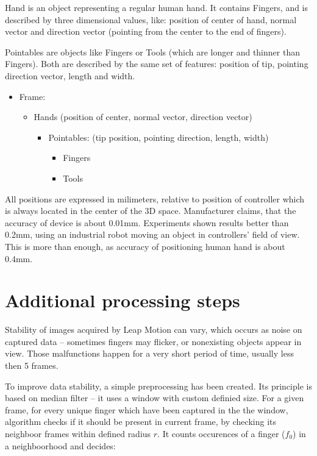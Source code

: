 Hand is an object representing a regular human hand. It contains Fingers, and is described by three dimensional values, like: position of center of hand, normal vector and direction vector (pointing from the center to the end of fingers). 

Pointables are objects like Fingers or Tools (which are longer and thinner than Fingers). Both are described by the same set of features: position of tip, pointing direction vector, length and width.

\begin{itemize}
	\item Frame:
	\begin{itemize}
		\item Hands (position of center, normal vector, direction vector)
			\begin{itemize}
				\item Pointables: (tip position, pointing direction, length, width)
				\begin{itemize}
					\item Fingers
					\item Tools
				\end{itemize}
			\end{itemize}
	\end{itemize}
\end{itemize}

All positions are expressed in milimeters, relative to position of controller which is always located in the center of the 3D space. Manufacturer claims, that the accuracy of device is about 0.01mm. Experiments shown results better than 0.2mm, using an industrial robot moving an object in controllers' field of view. This is more than enough, as accuracy of positioning human hand is about 0.4mm. \cite{lmAN} 

\section{Additional processing steps} \label{PreprocessingSection}

Stability of images acquired by Leap Motion can vary, which occurs as noise on captured data -- sometimes fingers may flicker, or nonexisting objects appear in view. Those malfunctions happen for a very short period of time, usually less then 5 frames. 

To improve data stability, a simple preprocessing has been created. Its principle is based on median filter -- it uses a window with custom definied size. For a given frame, for every unique finger which have been captured in the the window, algorithm checks if it should be present in current frame, by checking its neighboor frames within defined radius $r$. It counts occurences of a finger ($f_0$) in a neighboorhood and decides:

